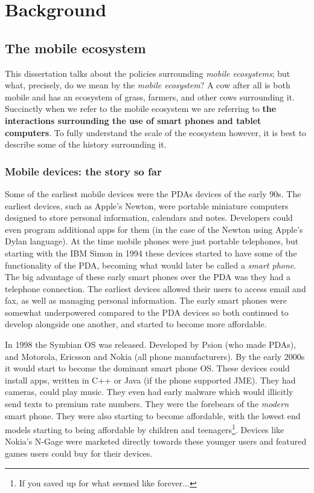 \documentclass[thesis.tex]{subfiles}
\begin{document}
\chapter{Background}

\section{The mobile ecosystem}\label{sec:mobile-ecosystem}

This dissertation talks about the policies surrounding \emph{mobile
ecosystems}; but what, precisely, do we mean by the \emph{mobile
ecosystem}?  A cow after all is both mobile and has an ecosystem of
grass, farmers, and other cows surrounding it.  Succinctly when we
refer to the mobile ecosystem we are referring to \textbf{the
interactions surrounding the use of smart phones and tablet
computers}.  To fully understand the scale of the ecosystem however,
it is best to describe some of the history surrounding it.

\subsection{Mobile devices: the story so far}

Some of the earliest mobile devices were the \acp{PDA} devices of the
early 90s.  The earliest devices, such as Apple's Newton, were
portable miniature computers designed to store personal information,
calendars and notes.  Developers could even program additional apps
for them (in the case of the Newton using Apple's Dylan language).  At
the time mobile phones were just portable telephones, but starting
with the IBM Simon in 1994 these devices started to have some of the
functionality of the \ac{PDA}, becoming what would later be called a
\emph{smart phone}.  The big advantage of these early smart phones
over the \ac{PDA} was they had a telephone connection.  The earliest
devices allowed their users to access email and fax, as well as
managing personal information.  The early smart phones were somewhat
underpowered compared to the \ac{PDA} devices so both continued to
develop alongside one another, and started to become more affordable.

In 1998 the Symbian OS was released.  Developed by Psion (who made
\acp{PDA}), and Motorola, Ericsson and Nokia (all phone
manufacturers).  By the early 2000s it would start to become the
dominant smart phone OS.  These devices could install apps, written in
C++ or Java (if the phone supported JME). They had cameras, could play
music. They even had early malware which would illicitly send texts to
premium rate numbers.  They were the forebears of the \emph{modern}
smart phone.
They were also starting to become affordable, with the lowest end
models starting to being affordable by children and
teenagers\footnote{If you saved up for what seemed like
  forever$\ldots$}.  Devices like Nokia's N-Gage were marketed directly
towards these younger users and featured games users could buy for
their devices.
\end{document}

